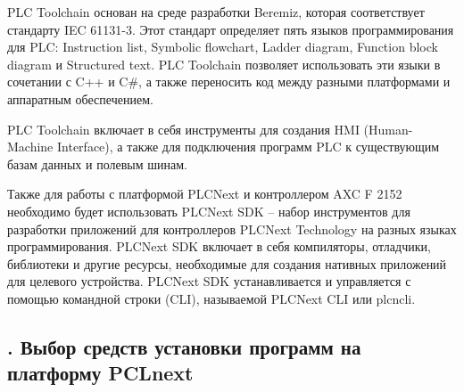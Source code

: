 {	\par \redline PLC Toolchain основан на среде разработки Beremiz, которая соответствует стандарту IEC 61131-3. Этот стандарт определяет пять языков программирования для PLC: Instruction list, Symbolic flowchart, Ladder diagram, Function block diagram и Structured text. PLC Toolchain позволяет использовать эти языки в сочетании с C++ и C\#, а также переносить код между разными платформами и аппаратным обеспечением.

	\par \redline PLC Toolchain включает в себя инструменты для создания HMI (Human-Machine Interface), а также для подключения программ PLC к существующим базам данных и полевым шинам. 

	\par \redline Также для работы с платформой PLCNext и контроллером AXC F 2152 необходимо будет использовать PLCNext SDK – набор инструментов для разработки приложений для контроллеров PLCNext Technology на разных языках программирования. PLCNext SDK включает в себя компиляторы, отладчики, библиотеки и другие ресурсы, необходимые для создания нативных приложений для целевого устройства. PLCNext SDK устанавливается и управляется с помощью командной строки (CLI), называемой PLCNext CLI или plcncli.

	\par
}

\subtitlespace

\subsection*{ 
	\gostTitleFont
	\redline
	\thechaptercntr .\thesubchaptercntr \spc
	Выбор средств установки программ на платформу PCLnext
} \addtocounter{subchaptercntr}{1}

\subtitlespace

